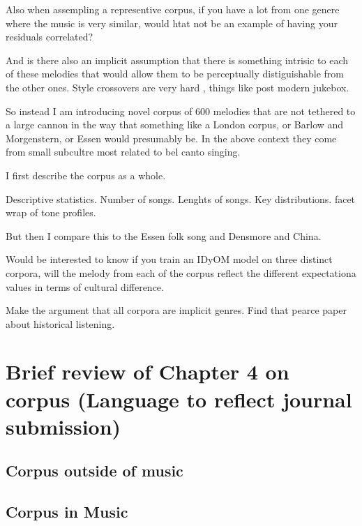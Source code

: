 \documentclass[]{book}
\begin{document}
Also when assempling a representive corpus, if you have a lot from one genere where the music is very similar, would htat not be an example of having your residuals correlated?

And is there also an implicit assumption that there is something intrisic to each of these melodies that would allow them to be perceptually distiguishable from the other ones.
Style crossovers are very hard , things like post modern jukebox.

So instead I am introducing novel corpus of 600 melodies that are not tethered to a large cannon in the way that something like a London corpus, or Barlow and Morgenstern, or Essen would presumably be.
In the above context they come from small subcultre most related to bel canto singing.

I first describe the corpus as a whole.

Descriptive statistics.
Number of songs.
Lenghts of songs.
Key distributions.
facet wrap of tone profiles.

But then I compare this to the Essen folk song and Densmore and China.

Would be interested to know if you train an IDyOM model on three distinct corpora, will the melody from each of the corpus reflect the different expectationa values in terms of cultural difference.

Make the argument that all corpora are implicit genres.
Find that pearce paper about historical listening.

\hypertarget{brief-review-of-chapter-4-on-corpus-language-to-reflect-journal-submission}{%
\section{Brief review of Chapter 4 on corpus (Language to reflect journal submission)}\label{brief-review-of-chapter-4-on-corpus-language-to-reflect-journal-submission}}

\hypertarget{corpus-outside-of-music}{%
\subsection{Corpus outside of music}\label{corpus-outside-of-music}}

\hypertarget{corpus-in-music}{%
\subsection{Corpus in Music}\label{corpus-in-music}}
\end{document}
